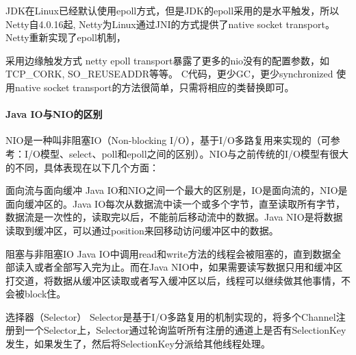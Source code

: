 \documentclass[../../../interview-questions.tex]{subfiles}
\begin{document}
JDK在Linux已经默认使用epoll方式，但是JDK的epoll采用的是水平触发，所以Netty自4.0.16起, Netty为Linux通过JNI的方式提供了native socket transport。Netty重新实现了epoll机制，

采用边缘触发方式
netty epoll transport暴露了更多的nio没有的配置参数，如 TCP\_CORK, SO\_REUSEADDR等等。
C代码，更少GC，更少synchronized
使用native socket transport的方法很简单，只需将相应的类替换即可。


\paragraph{Java IO与NIO的区别}

NIO是一种叫非阻塞IO（Non-blocking I/O），基于I/O多路复用来实现的（可参考：I/O模型、select、poll和epoll之间的区别）。NIO与之前传统的I/O模型有很大的不同，具体表现在以下几个方面：

面向流与面向缓冲
Java IO和NIO之间一个最大的区别是，IO是面向流的，NIO是面向缓冲区的。Java IO每次从数据流中读一个或多个字节，直至读取所有字节，数据流是一次性的，读取完以后，不能前后移动流中的数据。Java NIO是将数据读取到缓冲区，可以通过position来回移动访问缓冲区中的数据。

阻塞与非阻塞IO
Java IO中调用read和write方法的线程会被阻塞的，直到数据全部读入或者全部写入完为止。而在Java NIO中，如果需要读写数据只用和缓冲区打交道，将数据从缓冲区读取或者写入缓冲区以后，线程可以继续做其他事情，不会被block住。

选择器（Selector）
Selector是基于I/O多路复用的机制实现的，将多个Channel注册到一个Selector上，Selector通过轮询监听所有注册的通道上是否有SelectionKey发生，如果发生了，然后将SelectionKey分派给其他线程处理。
\end{document}
